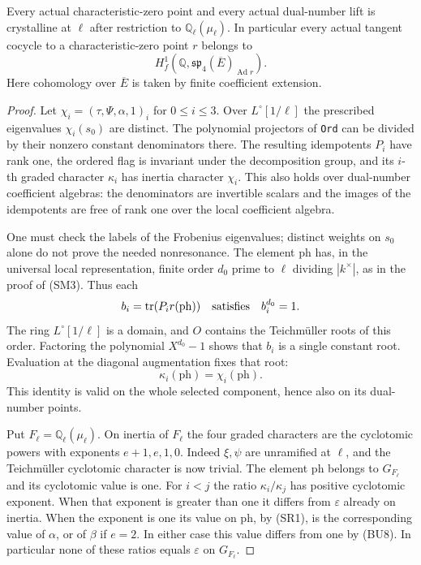\begin{proposition}
\label{prop:rh-symplectic-local-finite}
Every actual characteristic-zero point and every actual dual-number
lift is crystalline at \(\ell\) after restriction to
\(\mathbb Q_\ell(\mu_\ell)\). In particular every actual tangent
cocycle to a characteristic-zero point \(r\) belongs to
\[
 H^1_f(\mathbb Q,\mathfrak{sp}_4(\overline E)_{\operatorname{Ad}r}).
\]
Here cohomology over \(\overline E\) is taken by finite coefficient
extension.
\end{proposition}

\begin{proof}
Let \(\chi_i=(\tau,\Psi,\alpha,1)_i\) for \(0\le i\le3\).
Over \(L^\circ[1/\ell]\) the prescribed eigenvalues
\(\chi_i(s_0)\) are distinct. The polynomial projectors of
\texttt{Ord} can be divided by their nonzero constant
denominators there. The resulting idempotents \(P_i\)
have rank one, the ordered flag is invariant under the
decomposition group, and its \(i\)-th graded character
\(\kappa_i\) has inertia character \(\chi_i\).
This also holds over dual-number coefficient algebras:
the denominators are invertible scalars and the images
of the idempotents are free of rank one over the local
coefficient algebra.

One must check the labels of the Frobenius eigenvalues;
distinct weights on \(s_0\) alone do not prove the needed
nonresonance. The element \(\mathrm{ph}\) has, in the universal
local representation, finite order \(d_0\) prime to \(\ell\)
dividing \(|k^\times|\), as in the proof of (SM3).
Thus each
\[
 b_i=\operatorname{tr}(P_i r(\mathrm{ph}))
       \quad\hbox{satisfies}\quad b_i^{d_0}=1.
\]
The ring \(L^\circ[1/\ell]\) is a domain, and \(O\) contains the
Teichm\"uller roots of this order. Factoring the polynomial
\(X^{d_0}-1\) shows that \(b_i\) is a single constant root.
Evaluation at the diagonal augmentation fixes that root:
\[
 \kappa_i(\mathrm{ph})=\chi_i(\mathrm{ph}).
 \tag{SR1}
\]
This identity is valid on the whole selected component,
hence also on its dual-number points.

Put \(F_\ell=\mathbb Q_\ell(\mu_\ell)\).
On inertia of \(F_\ell\) the four graded characters
are the cyclotomic powers with exponents \(e+1,e,1,0\).
Indeed \(\xi,\psi\) are unramified at \(\ell\), and the
Teichm\"uller cyclotomic character is now trivial.
The element \(\mathrm{ph}\) belongs to \(G_{F_\ell}\)
and its cyclotomic value is one. For \(i<j\) the ratio
\(\kappa_i/\kappa_j\) has positive cyclotomic exponent.
When that exponent is greater than one it differs from
\(\varepsilon\) already on inertia. When the exponent
is one its value on \(\mathrm{ph}\), by (SR1), is
the corresponding value of \(\alpha\), or of \(\beta\)
if \(e=2\). In either case this value differs from one
by (BU8). In particular none of these ratios equals
\(\varepsilon\) on \(G_{F_\ell}\).


\end{proof}

